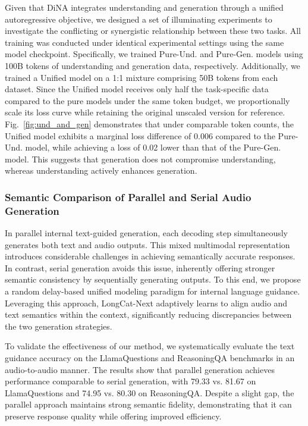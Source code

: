 Given that DiNA integrates understanding and generation through a unified autoregressive objective, we designed a set of illuminating experiments to investigate the conflicting or synergistic relationship between these two tasks. All training was conducted under identical experimental settings using the same model checkpoint. Specifically, we trained Pure-Und. and Pure-Gen. models using 100B tokens of understanding and generation data, respectively. Additionally, we trained a Unified model on a 1:1 mixture comprising 50B tokens from each dataset. Since the Unified model receives only half the task-specific data compared to the pure models under the same token budget, we proportionally scale its loss curve while retaining the original unscaled version for reference. Fig.~\ref{fig:und_and_gen} demonstrates that under comparable token counts, the Unified model exhibits a marginal loss difference of 0.006 compared to the Pure-Und. model, while achieving a loss of 0.02 lower than that of the Pure-Gen. model. This suggests that generation does not compromise understanding, whereas understanding actively enhances generation.

\subsubsection{Semantic Comparison of Parallel and Serial Audio Generation}
In parallel internal text-guided generation, each decoding step simultaneously generates both text and audio outputs. This mixed multimodal representation introduces considerable challenges in achieving semantically accurate responses.  In contrast, serial generation avoids this issue, inherently offering stronger semantic consistency by sequentially generating outputs.
To this end, we propose a random delay-based unified modeling paradigm for internal language guidance. Leveraging this approach, LongCat-Next adaptively learns to align audio and text semantics within the context, significantly reducing discrepancies between the two generation strategies.


To validate the effectiveness of our method, we systematically evaluate the text guidance accuracy on the LlamaQuestions and ReasoningQA benchmarks in an audio-to-audio manner. The results show that parallel generation achieves performance comparable to serial generation, with 79.33 vs. 81.67 on LlamaQuestions and 74.95 vs. 80.30 on ReasoningQA. Despite a slight gap, the parallel approach maintains strong semantic fidelity, demonstrating that it can preserve response quality while offering improved efficiency.

